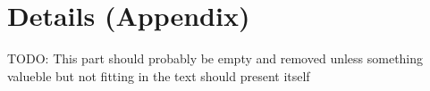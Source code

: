 \chapter{Details (Appendix)}\label{cha:details}

TODO: This part should probably be empty and removed unless something valueble but not fitting in the text should present itself